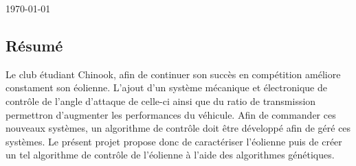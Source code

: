 \documentclass[11pt]{article}
\begin{document}
\begin{titlepage}


\vfill

{\large \today}\\[3cm] %


 

\end{titlepage}


\vspace*{\fill}
\begin{center}
\section*{Résumé}
\end{center}

Le club étudiant Chinook, afin de continuer son succès en compétition améliore constament son éolienne. L'ajout d'un système mécanique et électronique de contrôle de l'angle d'attaque de celle-ci ainsi que du ratio de transmission permettron d'augmenter les performances du véhicule. Afin de commander ces nouveaux systèmes, un algorithme de contrôle doit être développé afin de géré ces systèmes. Le présent projet propose donc de caractériser l'éolienne puis de créer un tel algorithme de contrôle de l'éolienne à l'aide des algorithmes génétiques.

\vspace*{\fill}
\clearpage
\end{document}

